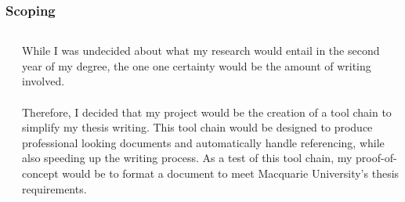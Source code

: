 \documentclass[aspectratio = 169]{beamer}
\begin{document}
\begin{frame}
\label{scoping}
\frametitle{Scoping}
\begin{columns}



\hyperlink{introI}{} \newline
\hyperlink{introII}{} \newline 
\hyperlink{scoping}{} \newline
\hyperlink{elaboration}{} \newline  
\hyperlink{software}{} \newline 
\hyperlink{toolchain}{} \newline 
\hyperlink{learning}{} \newline 
\hyperlink{problems}{} \newline 
\hyperlink{results}{} \newline
\hyperlink{exampleI}{} \newline 
\hyperlink{exampleII}{}  



While I was undecided about what my research would entail in the second year of my degree, the one one certainty would be the amount of writing involved.
\\~\\
Therefore, I decided that my project would be the creation of a tool chain to simplify my thesis writing. This tool chain would be designed to produce professional looking documents and automatically handle referencing, while also speeding up the writing process. As a test of this tool chain, my proof-of-concept would be to format a document to meet Macquarie University's thesis requirements.

\end{columns}
\end{frame}
\end{document}
